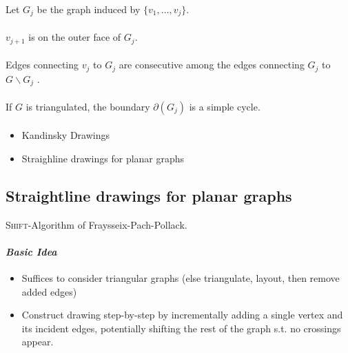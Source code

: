 \documentclass[10pt,twocolumn]{article}
\begin{document}
Let $G_j$ be the graph induced by $\{v_1, ..., v_j\}$.

\paragraph{} $v_{j+1}$ is on the outer face of $G_j$. 

\paragraph{} Edges connecting $v_j$ to $G_j$ are consecutive among the
edges connecting $G_j$ to $G \backslash G_j$ . 


\paragraph{} If $G$ is triangulated, the boundary $\partial(G_j)$ is
a simple cycle. 

\paragraph{}
\begin{itemize}
\item Kandinsky Drawings
\item Straighline drawings for planar graphs
\end{itemize}

\subsection{Straightline drawings for planar graphs}

\textsc{Shift}-Algorithm of {Fraysseix-Pach-Pollack}.

\paragraph{\textit{Basic Idea}}
\begin{itemize}
\item Suffices to consider triangular graphs (else triangulate, layout, then
  remove added edges)
\item Construct drawing step-by-step by incrementally adding a single vertex and
  its incident edges, potentially shifting the rest of the graph s.t. no
  crossings appear.
\end{itemize}
\end{document}
